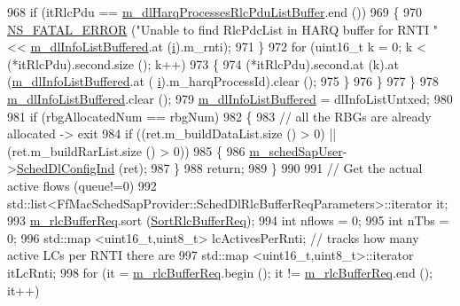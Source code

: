 \begin{DoxyCode}
968           \textcolor{keywordflow}{if} (itRlcPdu == \hyperlink{classns3_1_1RrFfMacScheduler_a2a6afd0a7df7a71c20382176f6cc9573}{m\_dlHarqProcessesRlcPduListBuffer}.end ())
969             \{
970               \hyperlink{group__fatal_ga5131d5e3f75d7d4cbfd706ac456fdc85}{NS\_FATAL\_ERROR} (\textcolor{stringliteral}{"Unable to find RlcPdcList in HARQ buffer for RNTI "} << 
      \hyperlink{classns3_1_1RrFfMacScheduler_a4176ffb0eba681a3e3b5be0be1a30771}{m\_dlInfoListBuffered}.at (\hyperlink{bernuolliDistribution_8m_a6f6ccfcf58b31cb6412107d9d5281426}{i}).m\_rnti);
971             \}
972           \textcolor{keywordflow}{for} (uint16\_t k = 0; k < (*itRlcPdu).second.size (); k++)
973             \{
974               (*itRlcPdu).second.at (k).at (\hyperlink{classns3_1_1RrFfMacScheduler_a4176ffb0eba681a3e3b5be0be1a30771}{m\_dlInfoListBuffered}.at (
      \hyperlink{bernuolliDistribution_8m_a6f6ccfcf58b31cb6412107d9d5281426}{i}).m\_harqProcessId).clear ();
975             \}
976         \}
977     \}
978   \hyperlink{classns3_1_1RrFfMacScheduler_a4176ffb0eba681a3e3b5be0be1a30771}{m\_dlInfoListBuffered}.clear ();
979   \hyperlink{classns3_1_1RrFfMacScheduler_a4176ffb0eba681a3e3b5be0be1a30771}{m\_dlInfoListBuffered} = dlInfoListUntxed;
980 
981   \textcolor{keywordflow}{if} (rbgAllocatedNum == rbgNum)
982     \{
983       \textcolor{comment}{// all the RBGs are already allocated -> exit}
984       \textcolor{keywordflow}{if} ((ret.m\_buildDataList.size () > 0) || (ret.m\_buildRarList.size () > 0))
985         \{
986           \hyperlink{classns3_1_1RrFfMacScheduler_a1d834e008836f5b748b81d8d3dc5f926}{m\_schedSapUser}->\hyperlink{classns3_1_1FfMacSchedSapUser_a28f8484af5a32a45ee6c0e51770d83f7}{SchedDlConfigInd} (ret);
987         \}
988       \textcolor{keywordflow}{return};
989     \}
990 
991   \textcolor{comment}{// Get the actual active flows (queue!=0)}
992   std::list<FfMacSchedSapProvider::SchedDlRlcBufferReqParameters>::iterator it;
993   \hyperlink{classns3_1_1RrFfMacScheduler_a25a4bfbb928e22dc026209de004b90fd}{m\_rlcBufferReq}.sort (\hyperlink{classns3_1_1RrFfMacScheduler_a834409ab0fff37d33390f6c2bec6a3bb}{SortRlcBufferReq});
994   \textcolor{keywordtype}{int} nflows = 0;
995   \textcolor{keywordtype}{int} nTbs = 0;
996   std::map <uint16\_t,uint8\_t> lcActivesPerRnti; \textcolor{comment}{// tracks how many active LCs per RNTI there are}
997   std::map <uint16\_t,uint8\_t>::iterator itLcRnti;
998   \textcolor{keywordflow}{for} (it = \hyperlink{classns3_1_1RrFfMacScheduler_a25a4bfbb928e22dc026209de004b90fd}{m\_rlcBufferReq}.begin (); it != \hyperlink{classns3_1_1RrFfMacScheduler_a25a4bfbb928e22dc026209de004b90fd}{m\_rlcBufferReq}.end (); it++)

\end{DoxyCode}
